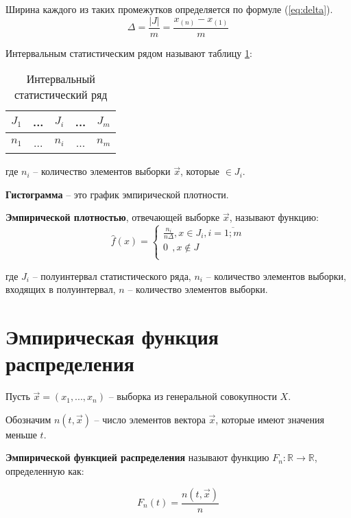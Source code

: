 Ширина каждого из таких промежутков определяется по формуле (\ref{eq:delta}).
\begin{equation}
	\label{eq:delta}
	\Delta = \frac{|J|}{m} = \frac{x_{(n)} - x_{(1)}}{m}
\end{equation}

Интервальным статистическим рядом называют таблицу \ref{table:row1}:

\begin{table}[ht!]
	\captionsetup{singlelinecheck = false, justification=raggedleft}
	\caption{Интервальный статистический ряд}
	\centering
	\label{table:row1}
	\begin{tabular}{|c|c|c|c|c|}
		\hline
		$J_1$ & ... & $J_i$ & ... & $J_m$ \\
		\hline
		$n_1$ & ... & $n_i$ & ... & $n_m$ \\
		\hline
	\end{tabular}
\end{table}

где $n_i$ -- количество элементов выборки $\vec x$, которые $\in J_i$.

\textbf{Гистограмма} -- это график эмпирической плотности. 

\textbf{Эмпирической плотностью}, отвечающей выборке $\vec x$, называют функцию:
\begin{equation}
	\hat f(x) =
	\begin{cases}
		\frac{n_i}{n \Delta}, x \in J_i, i = \overline{1; m} \\
		0\ \ , x \not\in J \\
	\end{cases}
\end{equation}

где $J_i$ -- полуинтервал статистического ряда, 
$n_i$ -- количество элементов выборки, входящих в полуинтервал, 
$n$ -- количество элементов выборки.


\section{Эмпирическая функция распределения}

Пусть $\vec x = (x_1, ..., x_n)$ -- выборка из генеральной совокупности $X$. 

Обозначим $n(t, \vec x)$ -- число элементов вектора $\vec x$, которые имеют значения меньше $t$.

\textbf{Эмпирической функцией распределения} называют функцию \newline
$F_n: \mathbb{R} \to \mathbb{R}$, определенную как: 

\begin{equation}
	F_n(t) = \frac{n(t, \vec x)}{n}
\end{equation}